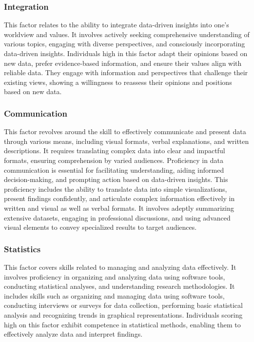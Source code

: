 \documentclass[
  12pt,
  a4paper,
  twoside]{article}
\begin{document}
\subsubsection{Integration}\label{integration}

This factor relates to the ability to integrate data-driven insights
into one's worldview and values. It involves actively seeking
comprehensive understanding of various topics, engaging with diverse
perspectives, and consciously incorporating data-driven insights.
Individuals high in this factor adapt their opinions based on new data,
prefer evidence-based information, and ensure their values align with
reliable data. They engage with information and perspectives that
challenge their existing views, showing a willingness to reassess their
opinions and positions based on new data.

\subsubsection{Communication}\label{communication}

This factor revolves around the skill to effectively communicate and
present data through various means, including visual formats, verbal
explanations, and written descriptions. It requires translating complex
data into clear and impactful formats, ensuring comprehension by varied
audiences. Proficiency in data communication is essential for
facilitating understanding, aiding informed decision-making, and
prompting action based on data-driven insights. This proficiency
includes the ability to translate data into simple visualizations,
present findings confidently, and articulate complex information
effectively in written and visual as well as verbal formats. It involves
adeptly summarizing extensive datasets, engaging in professional
discussions, and using advanced visual elements to convey specialized
results to target audiences.

\subsubsection{Statistics}\label{statistics}

This factor covers skills related to managing and analyzing data
effectively. It involves proficiency in organizing and analyzing data
using software tools, conducting statistical analyses, and understanding
research methodologies. It includes skills such as organizing and
managing data using software tools, conducting interviews or surveys for
data collection, performing basic statistical analysis and recognizing
trends in graphical representations. Individuals scoring high on this
factor exhibit competence in statistical methods, enabling them to
effectively analyze data and interpret findings.
\end{document}
